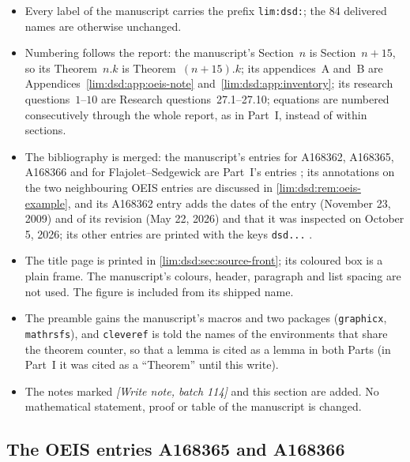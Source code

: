 \documentclass[11pt]{article}
\theoremstyle{definition}
\theoremstyle{remark}
\begin{document}
\begin{itemize}
\item Every label of the manuscript carries the prefix \texttt{lim:dsd:};
  the 84 delivered names are otherwise unchanged.
\item Numbering follows the report: the manuscript's Section~$n$ is
  Section~$n+15$, so its Theorem~$n.k$ is Theorem~$(n+15).k$; its
  appendices~A and~B are Appendices~\ref{lim:dsd:app:oeis-note}
  and~\ref{lim:dsd:app:inventory}; its research questions~$1$--$10$ are
  Research questions~27.1--27.10; equations are numbered consecutively
  through the whole report, as in Part~I, instead of within sections.
\item The bibliography is merged: the manuscript's entries for A168362,
  A168365, A168366 and for Flajolet--Sedgewick are Part~I's entries
  \cite{OEIS-A168362,OEIS-A168365,OEIS-A168366,FlajoletSedgewick}; its
  annotations on the two neighbouring OEIS entries are discussed in
  \cref{lim:dsd:rem:oeis-example}, and its A168362 entry adds the dates of
  the entry (November 23, 2009) and of its revision (May 22, 2026) and that
  it was inspected on October 5, 2026; its other entries are printed with the
  keys \texttt{dsd...} \cite{dsdrepo,dsdBCM,dsdRY}.
\item The title page is printed in \cref{lim:dsd:sec:source-front}; its
  coloured box is a plain frame. The manuscript's colours, header, paragraph
  and list spacing are not used. The figure is included from its shipped
  name.
\item The preamble gains the manuscript's macros and two packages
  (\texttt{graphicx}, \texttt{mathrsfs}), and \texttt{cleveref} is told the
  names of the environments that share the theorem counter, so that a
  lemma is cited as a lemma in both Parts (in Part~I it was cited as a
  ``Theorem'' until this write).
\item The notes marked \emph{[Write note, batch 114]} and this section are
  added. No mathematical statement, proof or table of the manuscript is
  changed.
\end{itemize}

\subsection{The OEIS entries A168365 and A168366}
\label{lim:dsd:sec:oeis}
\end{document}
